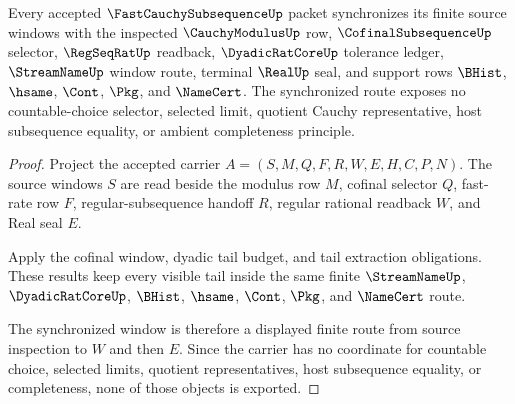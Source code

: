 \begin{theorem}
\label{thm:fast-cauchy-subsequence-synchronized-window}
Every accepted $\FastCauchySubsequenceUp$ packet synchronizes its finite source windows with the inspected $\CauchyModulusUp$ row, $\CofinalSubsequenceUp$ selector, $\RegSeqRatUp$ readback, $\DyadicRatCoreUp$ tolerance ledger, $\StreamNameUp$ window route, terminal $\RealUp$ seal, and support rows $\BHist$, $\hsame$, $\Cont$, $\Pkg$, and $\NameCert$. The synchronized route exposes no countable-choice selector, selected limit, quotient Cauchy representative, host subsequence equality, or ambient completeness principle.
\end{theorem}
\begin{proof}
Project the accepted carrier $A=(S,M,Q,F,R,W,E,H,C,P,N)$. The source windows $S$ are read beside the modulus row $M$, cofinal selector $Q$, fast-rate row $F$, regular-subsequence handoff $R$, regular rational readback $W$, and Real seal $E$.

Apply the cofinal window, dyadic tail budget, and tail extraction obligations. These results keep every visible tail inside the same finite $\StreamNameUp$, $\DyadicRatCoreUp$, $\BHist$, $\hsame$, $\Cont$, $\Pkg$, and $\NameCert$ route.

The synchronized window is therefore a displayed finite route from source inspection to $W$ and then $E$. Since the carrier has no coordinate for countable choice, selected limits, quotient representatives, host subsequence equality, or completeness, none of those objects is exported.
\end{proof}


